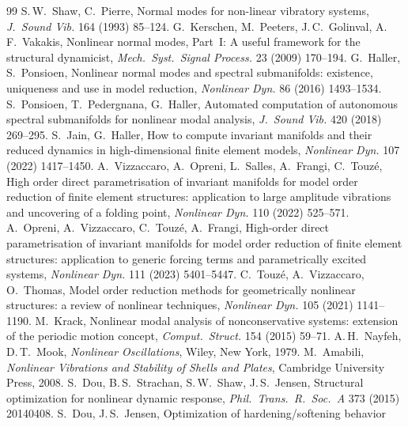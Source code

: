 \begin{thebibliography}{99}\small
 S.\,W.\ Shaw, C.\ Pierre, Normal modes for non-linear vibratory systems,
\emph{J.\ Sound Vib.} 164 (1993) 85--124.
 G.\ Kerschen, M.\ Peeters, J.\,C.\ Golinval, A.\,F.\ Vakakis, Nonlinear
normal modes, Part~I: A useful framework for the structural dynamicist, \emph{Mech.\ Syst.\
Signal Process.} 23 (2009) 170--194.
 G.\ Haller, S.\ Ponsioen, Nonlinear normal modes and spectral
submanifolds: existence, uniqueness and use in model reduction, \emph{Nonlinear Dyn.} 86
(2016) 1493--1534.
 S.\ Ponsioen, T.\ Pedergnana, G.\ Haller, Automated computation of
autonomous spectral submanifolds for nonlinear modal analysis, \emph{J.\ Sound Vib.} 420
(2018) 269--295.
 S.\ Jain, G.\ Haller, How to compute invariant manifolds and their reduced
dynamics in high-dimensional finite element models, \emph{Nonlinear Dyn.} 107 (2022)
1417--1450.
 A.\ Vizzaccaro, A.\ Opreni, L.\ Salles, A.\ Frangi, C.\ Touz\'e, High
order direct parametrisation of invariant manifolds for model order reduction of finite
element structures: application to large amplitude vibrations and uncovering of a folding
point, \emph{Nonlinear Dyn.} 110 (2022) 525--571.
 A.\ Opreni, A.\ Vizzaccaro, C.\ Touz\'e, A.\ Frangi, High-order direct
parametrisation of invariant manifolds for model order reduction of finite element
structures: application to generic forcing terms and parametrically excited systems,
\emph{Nonlinear Dyn.} 111 (2023) 5401--5447.
 C.\ Touz\'e, A.\ Vizzaccaro, O.\ Thomas, Model order reduction methods for
geometrically nonlinear structures: a review of nonlinear techniques, \emph{Nonlinear Dyn.}
105 (2021) 1141--1190.
 M.\ Krack, Nonlinear modal analysis of nonconservative systems: extension
of the periodic motion concept, \emph{Comput.\ Struct.} 154 (2015) 59--71.
\bibitem{nayfeh1979} A.\,H.\ Nayfeh, D.\,T.\ Mook, \emph{Nonlinear Oscillations}, Wiley, New
York, 1979.
 M.\ Amabili, \emph{Nonlinear Vibrations and Stability of Shells and
Plates}, Cambridge University Press, 2008.
 S.\ Dou, B.\,S.\ Strachan, S.\,W.\ Shaw, J.\,S.\ Jensen, Structural optimization
for nonlinear dynamic response, \emph{Phil.\ Trans.\ R.\ Soc.\ A} 373 (2015) 20140408.
\bibitem{doujensen2016} S.\ Dou, J.\,S.\ Jensen, Optimization of hardening/softening behavior

\end{thebibliography}
